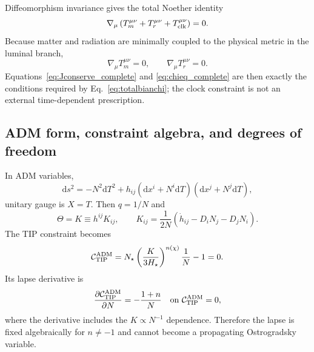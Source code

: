 \documentclass[aps,prd,reprint,nofootinbib,superscriptaddress,longbibliography]{revtex4-2}
\newcommand{\dd}{\mathrm{d}}
\begin{document}
Diffeomorphism invariance gives the total Noether identity
\begin{equation}
  \nabla_\mu\left(T^{\mu\nu}_{m}+T^{\mu\nu}_{r}+T^{\mu\nu}_{\rm clk}\right)=0.
  \label{eq:totalbianchi}
\end{equation}
Because matter and radiation are minimally coupled to the physical metric in the luminal branch,
\begin{equation}
  \nabla_\mu T^{\mu\nu}_{m}=0,
  \qquad
  \nabla_\mu T^{\mu\nu}_{r}=0.
  \label{eq:matterconservationcomplete}
\end{equation}
Equations~\eqref{eq:Jconserve_complete} and \eqref{eq:chieq_complete} are then exactly the conditions required by Eq.~\eqref{eq:totalbianchi}; the clock constraint is not an external time-dependent prescription.

\subsection{ADM form, constraint algebra, and degrees of freedom}
\label{subsec:ADM_constraints_complete}

In ADM variables,
\begin{equation}
  \dd s^2=-N^2\dd T^2+h_{ij}(\dd x^i+N^i\dd T)(\dd x^j+N^j\dd T),
\end{equation}
unitary gauge is $X=T$.  Then $q=1/N$ and
\begin{equation}
  \Theta=K\equiv h^{ij}K_{ij},
  \qquad
  K_{ij}=\frac{1}{2N}\left(\dot h_{ij}-D_iN_j-D_jN_i\right).
\end{equation}
The TIP constraint becomes
\begin{equation}
  {\cal C}_{\rm TIP}^{\rm ADM}
  =N_\star\left(\frac{K}{3H_\star}\right)^{n(\chi)}\frac{1}{N}-1=0 .
  \label{eq:ADM_TIP}
\end{equation}
Its lapse derivative is
\begin{equation}
  \frac{\partial {\cal C}_{\rm TIP}^{\rm ADM}}{\partial N}
  =-\frac{1+n}{N}
  \quad\hbox{on }{\cal C}_{\rm TIP}^{\rm ADM}=0,
  \label{eq:nondegenerate_lapse}
\end{equation}
where the derivative includes the $K\propto N^{-1}$ dependence.  Therefore the lapse is fixed algebraically for $n\ne-1$ and cannot become a propagating Ostrogradsky variable.
\end{document}
